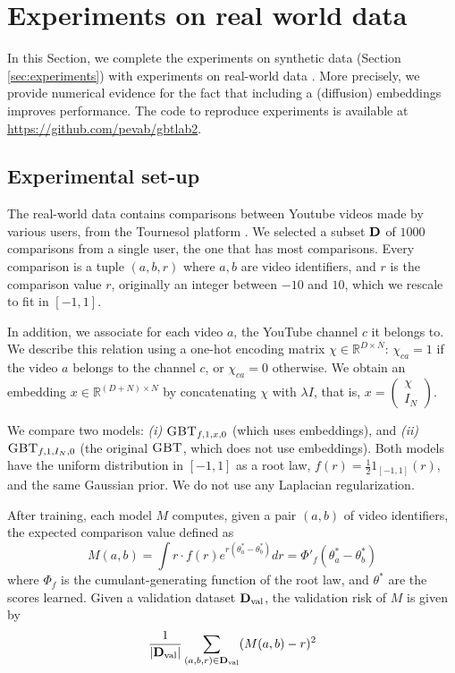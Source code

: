 \documentclass{article}
\newcommand{\GBT}{\textsc{GBT}}
\newcommand{\bD}{{\bf D}}
\begin{document}






\newpage
\appendix


\section{Experiments on real world data}
\label{sec:exper-real-world}

In this Section, we complete the experiments on synthetic data (Section \ref{sec:experiments}) with experiments on real-world data \cite{hoang2021tournesolquestlargesecure}.
More precisely, we provide numerical evidence for the fact that including a (diffusion) embeddings improves performance.
The code to reproduce experiments is available at \url{https://github.com/pevab/gbtlab2}.

\subsection{Experimental set-up}
The real-world data contains comparisons between Youtube videos made by various users, from the Tournesol platform \cite{hoang2024solidagomodularcollaborativescoring}.
We selected a subset $\bD$ of $1000$ comparisons from a single user, the one that has most comparisons.
Every comparison is a tuple $(a,b,r)$ where $a,b$ are video identifiers, and $r$ is the comparison value $r$, originally an integer between $-10$ and $10$, which we rescale to fit in $[-1,1]$.

In addition, we associate for each video $a$, the YouTube channel $c$ it belongs to. We describe this relation using a one-hot encoding matrix $\chi \in \mathbb{R}^{D \times N}$: $\chi_{ca} = 1$ if the video $a$ belongs to the channel $c$,
or $\chi_{ca} = 0$ otherwise.
We obtain an embedding $x \in \mathbb{R}^{(D + N)\times N}$ by concatenating $\chi$ with $\lambda I$, that is, $x = \begin{pmatrix} \chi \\ I_N \end{pmatrix}$.

We compare two models: \emph{(i)} $\GBT_{f, 1, x, 0}$ (which uses embeddings), 
and \emph{(ii)} $\GBT_{f, 1, I_N, 0}$ (the original $\GBT$, which does not use embeddings).
Both models have the uniform distribution in $[-1, 1]$ as a root law, $f(r) = \tfrac{1}{2} 1_{[-1, 1]}(r)$, and the same Gaussian prior. We do not use any Laplacian regularization.

After training, each model $M$ computes, given a pair $(a,b)$ of video identifiers, the expected comparison value defined as  
\begin{equation}
    M(a,b) = \int r \cdot f(r) e^{r (\theta^*_a - \theta^*_b)} dr = \Phi'_f(\theta^*_a - \theta^*_b)
\end{equation}
where $\Phi_f$ is the cumulant-generating function of the root law, 
and $\theta^*$ are the scores learned.
Given a validation dataset $\bD_{\text{val}}$, the validation risk of $M$ is given by
\begin{equation}
    \frac{1}{|\bD_{\text{val}}|} \sum_{(a,b,r) \in \bD_{\text{val}}}  (M(a,b) - r)^2
\end{equation}
\end{document}
